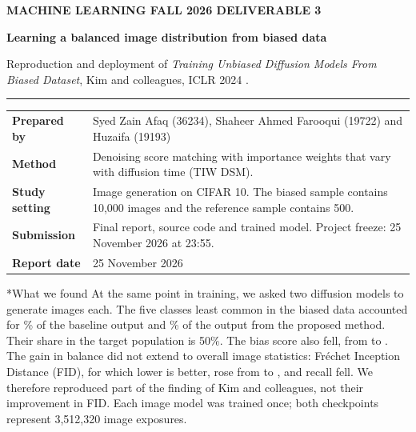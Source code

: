 \documentclass[11pt,a4paper]{article}
\makeatletter
\renewcommand\subsection{\@startsection{subsection}{2}{\z@}{1.5ex plus .2ex}{.4ex}{\normalfont\large\bfseries\color{Accent}\raggedright}}
\makeatother
\begin{document}
\thispagestyle{empty}
{\sffamily\small\bfseries\color{Accent}MACHINE LEARNING \enspace\textbar\enspace FALL 2026 \enspace\textbar\enspace DELIVERABLE 3\par}
\vspace{7mm}
{\Huge\bfseries\color{Ink}Learning a balanced image distribution from biased data\par}
\vspace{2mm}
{\large\color{Muted}Reproduction and deployment of \textit{Training Unbiased Diffusion Models From Biased Dataset}, Kim and colleagues, ICLR 2024 \cite{kim2024tiwdsm}.\par}
\vspace{4mm}
{\color{Rule}\hrule}
\vspace{2mm}
\begin{tabularx}{\linewidth}{@{}P{31mm}Y@{}}
\textbf{Prepared by} & Syed Zain Afaq (36234), Shaheer Ahmed Farooqui (19722) and Huzaifa (19193)\\
\textbf{Method} & Denoising score matching with importance weights that vary with diffusion time (TIW DSM).\\
\textbf{Study setting} & Image generation on CIFAR 10. The biased sample contains 10,000 images and the reference sample contains 500.\\
\textbf{Submission} & Final report, source code and trained model. Project freeze: 25 November 2026 at 23:55.\\
\textbf{Report date} & 25 November 2026\\
\end{tabularx}
\vspace{3mm}
\subsection*{What we found}
At the same point in training, we asked two diffusion models to generate \resNimgtiw{} images each. The five classes least common in the biased data accounted for \resTailobs\% of the baseline output and \resTailtiw\% of the output from the proposed method. Their share in the target population is 50\%. The bias score also fell, from \resBiasobs{} to \resBiastiw{}. The gain in balance did not extend to overall image statistics: Fréchet Inception Distance (FID), for which lower is better, rose from \resFIDobs{} to \resFIDtiw{}, and recall fell. We therefore reproduced part of the finding of Kim and colleagues, not their improvement in FID. Each image model was trained once; both checkpoints represent 3,512,320 image exposures.
\end{document}
